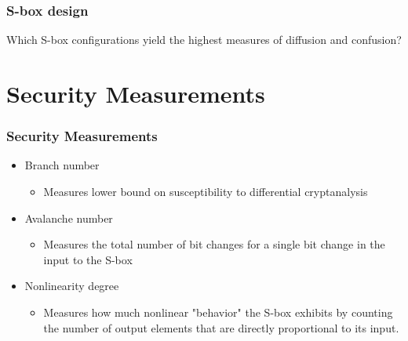 \documentclass[handout]{beamer}
\begin{document}
\begin{frame}
	\frametitle{S-box design}
	Which S-box configurations yield the highest measures of diffusion and confusion?
\end{frame}

\section{Security Measurements}
\begin{frame}
	\frametitle{Security Measurements}
	\begin{itemize}
		\item Branch number 
		\begin{itemize}
			\item Measures lower bound on susceptibility to differential cryptanalysis
		\end{itemize}
		\item Avalanche number
		\begin{itemize}
			\item Measures the total number of bit changes for a single bit change in the input to the S-box
		\end{itemize}
		\item Nonlinearity degree 
		\begin{itemize}
			\item Measures how much nonlinear "behavior" the S-box exhibits by counting the number of output elements that are directly proportional to its input.
		\end{itemize}
	\end{itemize}
\end{frame}
\end{document}
